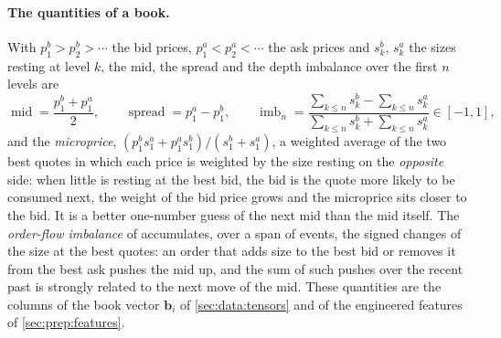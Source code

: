 \paragraph{The quantities of a book.}  With $p^{b}_1 > p^{b}_2 > \cdots$ the bid prices,
$p^{a}_1 < p^{a}_2 < \cdots$ the ask prices and $s^{b}_k$, $s^{a}_k$ the sizes resting at
level $k$, the mid, the spread and the depth imbalance over the first $n$ levels are
\begin{equation}
  \operatorname{mid} = \frac{p^{b}_1 + p^{a}_1}{2}, \qquad
  \operatorname{spread} = p^{a}_1 - p^{b}_1, \qquad
  \operatorname{imb}_n = \frac{\sum_{k \le n} s^{b}_k - \sum_{k \le n} s^{a}_k}{\sum_{k \le n} s^{b}_k + \sum_{k \le n} s^{a}_k} \in [-1, 1],
\end{equation}
and the \emph{microprice}, $(p^{b}_1 s^{a}_1 + p^{a}_1 s^{b}_1) / (s^{b}_1 + s^{a}_1)$, a
weighted average of the two best quotes in which each price is weighted by the size resting
on the \emph{opposite} side: when little is resting at the best bid, the bid is the quote
more likely to be consumed next, the weight of the bid price grows and the microprice sits
closer to the bid.  It is a better one-number guess of the next mid than the mid itself.  The \emph{order-flow imbalance} of \textcite{cont2014price}
accumulates, over a span of events, the signed changes of the size at the best quotes:
an order that adds size to the best bid or removes it from the best ask pushes the mid up,
and the sum of such pushes over the recent past is strongly related to the next move of
the mid.  These quantities are the columns of the book vector $\mathbf{b}_i$ of
\cref{sec:data:tensors} and of the engineered features of \cref{sec:prep:features}.

